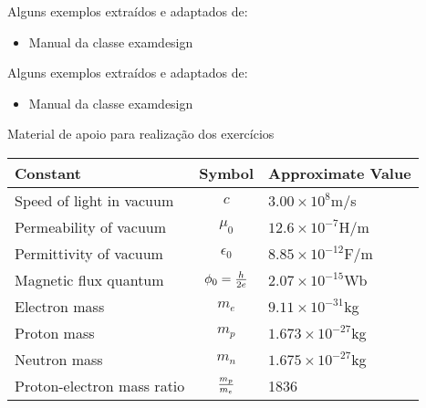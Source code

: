 \documentclass[11pt]{examdesign}
\begin{document}
\begin{examclosing}
\vfill
\begin{notap}
Alguns exemplos extraídos e adaptados de:
\begin{itemize}
	\item Manual da classe examdesign
\end{itemize}
\end{notap}
\end{examclosing}
\begin{keyclosing}
\vfill
\begin{notap}
Alguns exemplos extraídos e adaptados de:
\begin{itemize}
	\item Manual da classe examdesign
\end{itemize}
\end{notap}
\end{keyclosing}


\begin{endmatter}

\centerline
{\Large Material de apoio para realização dos exercícios}
\bigskip
\bigskip

  \begin{center}
  \begin{tabular}{lcl}
    Constant & Symbol & Approximate Value \\ \hline
    Speed of light in vacuum & $c$ & $3.00 \times 10^8$m/s \\
    Permeability of vacuum & $\mu_0$ & $12.6 \times 10^{-7}$H/m \\
    Permittivity of vacuum & $\epsilon_0$ & $8.85 \times 10^{-12}$F/m \\
    Magnetic flux quantum & $\phi_0 = {h \over 2e}$ & $2.07 \times 10^{-15}$Wb \\
    Electron mass & $m_e$ & $9.11 \times 10^{-31}$kg \\
    Proton mass & $m_p$ & $1.673 \times 10^{-27}$kg \\
    Neutron mass & $m_n$ & $1.675 \times 10^{-27}$kg \\
    Proton-electron mass ratio & $m_p \over m_e$ & 1836
  \end{tabular}
  \end{center}
\end{endmatter}











 
\end{document}
